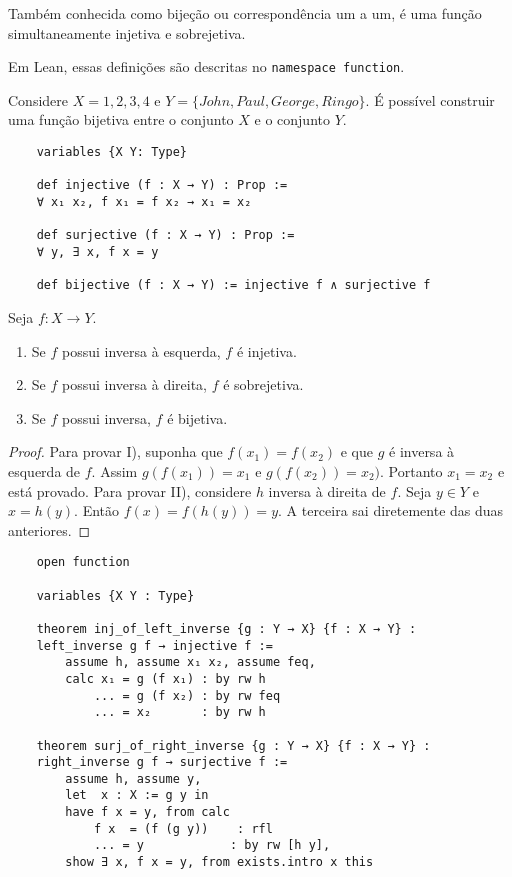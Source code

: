 \begin{definition}
    \label{def7}
    Também conhecida como bijeção ou correspondência um a um, é uma função simultaneamente injetiva e
    sobrejetiva.
\end{definition}

Em Lean, essas definições são descritas no \lstinline{namespace function}.

\begin{example}
    Considere $X = {1,2,3,4}$ e $Y = \{John, Paul, George, Ringo\}$. É possível construir uma função bijetiva
    entre o conjunto $X$ e o conjunto $Y$.
\end{example}

\begin{lstlisting}
    variables {X Y: Type}

    def injective (f : X → Y) : Prop :=
    ∀ x₁ x₂, f x₁ = f x₂ → x₁ = x₂

    def surjective (f : X → Y) : Prop :=
    ∀ y, ∃ x, f x = y

    def bijective (f : X → Y) := injective f ∧ surjective f
\end{lstlisting}

\begin{theorem}
    \label{prop5}
    Seja $f : X \to Y$.
    \renewcommand{\labelenumi}{\Roman{enumi}}
    \begin{enumerate}
        \item Se $f$ possui inversa à esquerda, $f$ é injetiva.
        \item Se $f$ possui inversa à direita, $f$ é sobrejetiva.
        \item Se $f$ possui inversa, $f$ é bijetiva.
    \end{enumerate}
\end{theorem}
\begin{proof}
    Para provar I), suponha que $f(x_1) = f(x_2)$ e que $g$ é inversa à esquerda
    de $f$. Assim $g(f(x_1)) = x_1$ e $g(f(x_2)) = x_2)$. Portanto $x_1 = x_2$ e
    está provado. Para provar II), considere $h$ inversa à direita de $f$. Seja
    $y \in Y$ e $x = h(y)$. Então $f(x) = f(h(y)) = y$. A terceira sai diretemente
    das duas anteriores.
\end{proof}

\begin{lstlisting}
    open function

    variables {X Y : Type}

    theorem inj_of_left_inverse {g : Y → X} {f : X → Y} :
    left_inverse g f → injective f :=
        assume h, assume x₁ x₂, assume feq,
        calc x₁ = g (f x₁) : by rw h
            ... = g (f x₂) : by rw feq
            ... = x₂       : by rw h

    theorem surj_of_right_inverse {g : Y → X} {f : X → Y} :
    right_inverse g f → surjective f :=
        assume h, assume y,
        let  x : X := g y in
        have f x = y, from calc
            f x  = (f (g y))    : rfl
            ... = y            : by rw [h y],
        show ∃ x, f x = y, from exists.intro x this
\end{lstlisting}

